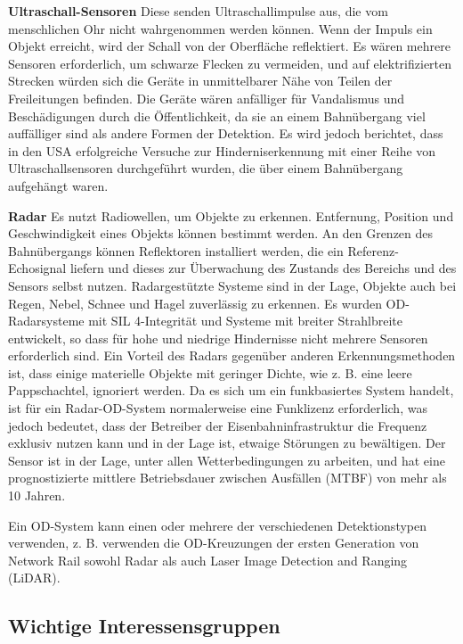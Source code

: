\documentclass[
]{book}
\begin{document}
\textbf{Ultraschall-Sensoren}
Diese senden Ultraschallimpulse aus, die vom menschlichen Ohr nicht wahrgenommen werden können. Wenn der Impuls ein Objekt erreicht, wird der Schall von der Oberfläche reflektiert. Es wären mehrere Sensoren erforderlich, um schwarze Flecken zu vermeiden, und auf elektrifizierten Strecken würden sich die Geräte in unmittelbarer Nähe von Teilen der Freileitungen befinden. Die Geräte wären anfälliger für Vandalismus und Beschädigungen durch die Öffentlichkeit, da sie an einem Bahnübergang viel auffälliger sind als andere Formen der Detektion. Es wird jedoch berichtet, dass in den USA erfolgreiche Versuche zur Hinderniserkennung mit einer Reihe von Ultraschallsensoren durchgeführt wurden, die über einem Bahnübergang aufgehängt waren.

\textbf{Radar}
Es nutzt Radiowellen, um Objekte zu erkennen. Entfernung, Position und Geschwindigkeit eines Objekts können bestimmt werden. An den Grenzen des Bahnübergangs können Reflektoren installiert werden, die ein Referenz-Echosignal liefern und dieses zur Überwachung des Zustands des Bereichs und des Sensors selbst nutzen. Radargestützte Systeme sind in der Lage, Objekte auch bei Regen, Nebel, Schnee und Hagel zuverlässig zu erkennen. Es wurden OD-Radarsysteme mit SIL 4-Integrität und Systeme mit breiter Strahlbreite entwickelt, so dass für hohe und niedrige Hindernisse nicht mehrere Sensoren erforderlich sind. Ein Vorteil des Radars gegenüber anderen Erkennungsmethoden ist, dass einige materielle Objekte mit geringer Dichte, wie z. B. eine leere Pappschachtel, ignoriert werden. Da es sich um ein funkbasiertes System handelt, ist für ein Radar-OD-System normalerweise eine Funklizenz erforderlich, was jedoch bedeutet, dass der Betreiber der Eisenbahninfrastruktur die Frequenz exklusiv nutzen kann und in der Lage ist, etwaige Störungen zu bewältigen. Der Sensor ist in der Lage, unter allen Wetterbedingungen zu arbeiten, und hat eine prognostizierte mittlere Betriebsdauer zwischen Ausfällen (MTBF) von mehr als 10 Jahren.

Ein OD-System kann einen oder mehrere der verschiedenen Detektionstypen verwenden, z. B. verwenden die OD-Kreuzungen der ersten Generation von Network Rail sowohl Radar als auch Laser Image Detection and Ranging (LiDAR).

\hypertarget{wichtige-interessensgruppen-2}{%
\subsection*{Wichtige Interessensgruppen}\label{wichtige-interessensgruppen-2}}
\end{document}
